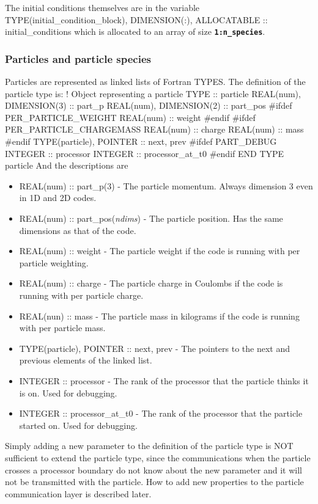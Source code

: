 \documentclass[12pt,a4paper]{article}
\newcommand{\inlinecode}[1]{{\color{warwickred} \bf\texttt{#1}}}
\newenvironment{boxverbatim}{\lboxverbatim{none}}{\endlboxverbatim}
\begin{document}
The initial conditions themselves are in the variable
\begin{boxverbatim}
TYPE(initial_condition_block), DIMENSION(:), ALLOCATABLE :: initial_conditions
\end{boxverbatim}
which is allocated to an array of size \inlinecode{1:n\_species}.

\subsubsection{Particles and particle species}
Particles are represented as linked lists of Fortran TYPES. The definition of
the particle type is:
\begin{boxverbatim}
  ! Object representing a particle
  TYPE :: particle
    REAL(num), DIMENSION(3) :: part_p
    REAL(num), DIMENSION(2) :: part_pos
#ifdef PER_PARTICLE_WEIGHT
    REAL(num) :: weight
#endif
#ifdef PER_PARTICLE_CHARGEMASS
    REAL(num) :: charge
    REAL(num) :: mass
#endif
    TYPE(particle), POINTER :: next, prev
#ifdef PART_DEBUG
    INTEGER :: processor
    INTEGER :: processor_at_t0
#endif
  END TYPE particle
\end{boxverbatim}
And the descriptions are
\begin{itemize}
\item REAL(num) :: part\_p(3) - The particle momentum. Always dimension 3 even
  in 1D and 2D codes.
\item REAL(num) :: part\_pos({\it ndims}) - The particle position. Has
  the same dimensions as that of the code.
\item REAL(num) :: weight - The particle weight if the code is running with
  per particle weighting.
\item REAL(num) :: charge - The particle charge in Coulombs if the code is
  running with per particle charge.
\item REAL(nun) :: mass - The particle mass in kilograms if the code is
  running with per particle mass.
\item TYPE(particle), POINTER :: next, prev - The pointers to the next and
  previous elements of the linked list.
\item INTEGER :: processor - The rank of the processor that the particle
  thinks it is on. Used for debugging.
\item INTEGER :: processor\_at\_t0 - The rank of the processor that the
  particle started on. Used for debugging.
\end{itemize}
Simply adding a new parameter to the definition of the particle type is NOT
sufficient to extend the particle type, since the communications when the
particle crosses a processor boundary do not know about the new parameter and
it will not be transmitted with the particle. How to add new properties to the
particle communication layer is described later.\\
\end{document}
